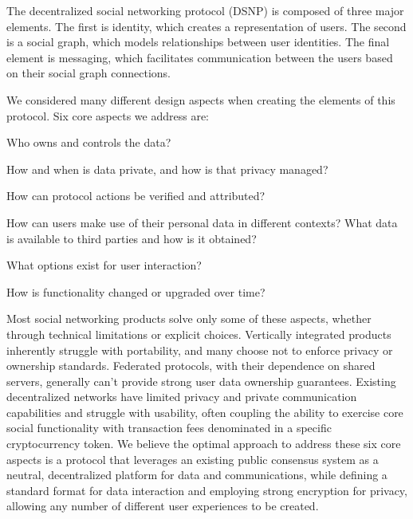 \documentclass[12pt,letterpaper]{article}
\providecommand{\tightlist}{%
\setlength{\itemsep}{0pt}\setlength{\parskip}{0pt}}
\begin{document}
The decentralized social networking protocol (DSNP) is composed of three major elements.
The first is identity, which creates a representation of users. The second is a social
graph, which models relationships between user identities. The final element is messaging,
which facilitates communication between the users based on their social graph connections.

\begin{samepage}
	We considered many different design aspects when creating the elements of
	this protocol. Six core aspects we address are:

	\begin{description}
		\tightlist
		\item[Agency:]
		      Who owns and controls the data?
		\item[Privacy:]
		      How and when is data private, and how is that privacy managed?
		\item[Authenticity:]
		      How can protocol actions be verified and attributed?
		\item[Portability:]
		      How can users make use of their personal data in different contexts?
		      What data is available to third parties and how is it obtained?
		\item[Usability:]
		      What options exist for user interaction?
		\item[Extensibility:]
		      How is functionality changed or upgraded over time?
	\end{description}
\end{samepage}

Most social networking products solve only some of these aspects, whether through technical
limitations or explicit choices. Vertically integrated products inherently struggle with
portability, and many choose not to enforce privacy or ownership standards. Federated
protocols, with their dependence on shared servers, generally can't provide strong user data
ownership guarantees. Existing decentralized networks have limited privacy and private
communication capabilities and struggle with usability, often coupling the ability to exercise
core social functionality with transaction fees denominated in a specific cryptocurrency token.
We believe the optimal approach to
address these six core aspects is a protocol that leverages an existing public consensus
system as a neutral, decentralized platform for data and communications, while defining a
standard format for data interaction and employing strong encryption for privacy, allowing
any number of different user experiences to be created.
\end{document}
